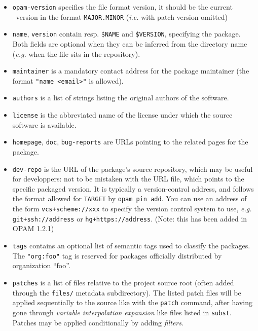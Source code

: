 \documentclass[a4paper,10pt]{article}
\begin{document}
\begin{itemize}

\item {\tt opam-version} specifies the file format version, it should be the
  current \OPAM\ version in the format {\tt MAJOR.MINOR} (\emph{i.e.} with patch
  version omitted)

\item {\tt name}, {\tt version} contain resp. \verb+$NAME+ and \verb+$VERSION+,
  specifying the package. Both fields are optional when they can be inferred
  from the directory name (\emph{e.g.} when the file sits in the repository).

\item {\tt maintainer} is a mandatory contact address for the package maintainer
  (the format {\tt "name <email>"} is allowed).

\item {\tt authors} is a list of strings listing the original authors of the
  software.

\item {\tt license} is the abbreviated name of the license under which the
  source software is available.

\item {\tt homepage}, {\tt doc}, {\tt bug-reports} are URLs pointing to the
  related pages for the package.

\item {\tt dev-repo} is the URL of the package's source repository, which may be
  useful for developpers: not to be mistaken with the URL file, which points to
  the specific packaged version. It is typically a version-control address, and
  follows the format allowed for {\tt TARGET} by {\tt opam pin add}. You can use
  an address of the form {\tt vcs+scheme://xxx} to specify the version control
  system to use, {\em e.g.} {\tt git+ssh://address} or {\tt hg+https://address}.
  (Note: this has been added in OPAM 1.2.1)

\item {\tt tags} contains an optional list of semantic tags used to classify the
  packages. The {\tt "org:foo"} tag is reserved for packages officially
  distributed by organization ``foo''.

\item {\tt patches} is a list of files relative to the project source root
  (often added through the {\tt files/} metadata subdirectory). The listed patch
  files will be applied sequentially to the source like with the {\tt patch}
  command, after having gone through {\em variable interpolation expansion} like
  files listed in {\tt subst}. Patches may be applied conditionally by adding
  {\em filters}.


\end{itemize}
\end{document}
